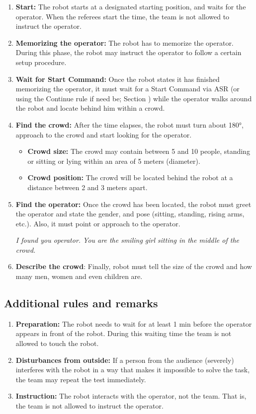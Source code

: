 \begin{enumerate}

\item \textbf{Start:} The robot starts at a designated starting position, and waits for the  operator. When the referees start the time, the team is not allowed to instruct the operator.
\item \textbf{Memorizing the operator:} The robot has to memorize the operator. During this phase, the robot may instruct the operator to follow a certain setup procedure.
\item \textbf{Wait for Start Command:} Once the robot states it has finished memorizing the operator, it must wait for a Start Command via ASR (or using the Continue rule if need be; Section ) while the operator walks around the robot and locate behind him within a crowd.
\item \textbf{Find the crowd:} After the time elapses, the robot must turn about 180°, approach to the crowd and start looking for the operator.
\begin{itemize}
\item \textbf{Crowd size:} The crowd may contain between 5 and 10 people, standing or sitting or lying within an  area of 5 meters (diameter).
\item \textbf{Crowd position:} The crowd will be located behind the robot at a distance between 2 and 3 meters apart.
\end{itemize}
\item \textbf{Find the operator:} Once the crowd has been located, the robot must greet the operator and state the gender, and pose (sitting, standing, rising arms, etc.). Also, it must point or approach to the operator.

\textit{I found you operator. You are the smiling girl sitting in the middle of the crowd.}

\item \textbf{Describe the crowd}: Finally, robot must tell the size of the crowd and how many men, women and even children are.
\end{enumerate}

\subsection{Additional rules and remarks}
\begin{enumerate}
\item \textbf{Preparation:} The robot needs to wait for at least 1 min before the operator appears in front of the robot. During this waiting time the team is not allowed to touch the robot.
\item \textbf{Disturbances from outside:} If a person from the audience (severely) interferes with the robot in a way that makes it impossible to solve the task, the team may repeat the test immediately.
\item \textbf{Instruction:} The robot interacts with the operator, not the team. That is, the team is not allowed to instruct the operator.
\end{enumerate}


